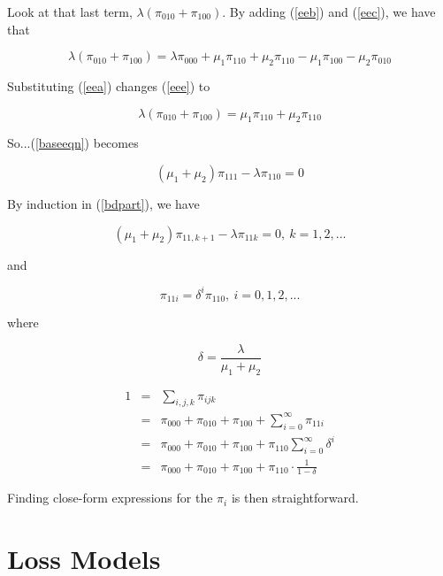 Look at that last term, $\lambda (\pi_{010}+\pi_{100})$.  By adding
(\ref{eeb}) and (\ref{eec}), we have that

\begin{equation}
\label{eee}
\lambda (\pi_{010}+\pi_{100}) = 
\lambda \pi_{000} +  \mu_1 \pi_{110} + \mu_2 \pi_{110}
- \mu_1 \pi_{100} - \mu_2 \pi_{010}
\end{equation}

Substituting (\ref{eea}) changes (\ref{eee}) to

\begin{equation}
\lambda (\pi_{010}+\pi_{100}) = 
\mu_1 \pi_{110} + \mu_2 \pi_{110}
\end{equation}

So...(\ref{baseeqn}) becomes

\begin{equation}
(\mu_1+\mu_2) \pi_{111} - \lambda \pi_{110} = 0
\end{equation}

By induction in (\ref{bdpart}), we have

\begin{equation}
(\mu_1+\mu_2) \pi_{11,k+1} - \lambda \pi_{11k} = 0, ~ k = 1,2,...
\end{equation}

and

\begin{equation}
\pi_{11i} = \delta^i \pi_{110}, ~ i = 0,1,2,...
\end{equation}

where

\begin{equation}
\delta = \frac{\lambda}{\mu_1+\mu_2}
\end{equation}

\begin{eqnarray}
1 &=& \sum_{i,j,k} \pi_{ijk} \\
&=& 
\pi_{000} +
\pi_{010} +
\pi_{100} +
\sum_{i=0}^{\infty} \pi_{11i} \\
&=& 
\pi_{000} +
\pi_{010} +
\pi_{100} +
\pi_{110} \sum_{i=0}^{\infty} \delta^i \\
&=& 
\pi_{000} +
\pi_{010} +
\pi_{100} +
\pi_{110} \cdot \frac{1}{1-\delta}
\end{eqnarray}

Finding close-form expressions for the $\pi_i$ is then straightforward.

\section{Loss Models}

